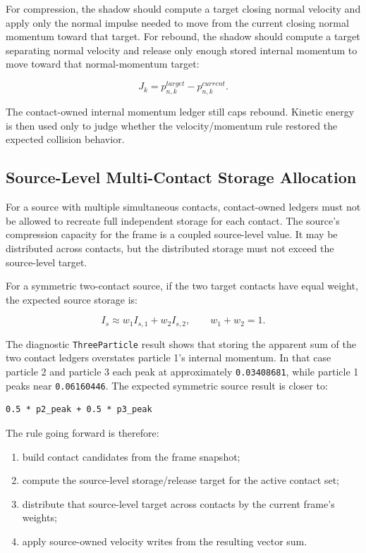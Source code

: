 For compression, the shadow should compute a target closing normal velocity
and apply only the normal impulse needed to move from the current closing
normal momentum toward that target.  For rebound, the shadow should compute a
target separating normal velocity and release only enough stored internal
momentum to move toward that normal-momentum target:

\begin{equation}
J_k =
p^{target}_{n,k} - p^{current}_{n,k}.
\end{equation}

The contact-owned internal momentum ledger still caps rebound.  Kinetic energy
is then used only to judge whether the velocity/momentum rule restored the
expected collision behavior.

\subsection{Source-Level Multi-Contact Storage Allocation}

For a source with multiple simultaneous contacts, contact-owned ledgers must
not be allowed to recreate full independent storage for each contact.  The
source's compression capacity for the frame is a coupled source-level value.
It may be distributed across contacts, but the distributed storage must not
exceed the source-level target.

For a symmetric two-contact source, if the two target contacts have equal
weight, the expected source storage is:

\begin{equation}
I_s
\approx
w_1 I_{s,1} + w_2 I_{s,2},
\qquad
w_1+w_2=1.
\end{equation}

The diagnostic \texttt{ThreeParticle} result shows that storing the apparent
sum of the two contact ledgers overstates particle 1's internal momentum.  In
that case particle 2 and particle 3 each peak at approximately
\texttt{0.03408681}, while particle 1 peaks near \texttt{0.06160446}.  The
expected symmetric source result is closer to:

\begin{verbatim}
0.5 * p2_peak + 0.5 * p3_peak
\end{verbatim}

The rule going forward is therefore:

\begin{enumerate}[leftmargin=*]
    \item build contact candidates from the frame snapshot;
    \item compute the source-level storage/release target for the active
    contact set;
    \item distribute that source-level target across contacts by the current
    frame's weights;
    \item apply source-owned velocity writes from the resulting vector sum.
\end{enumerate}

